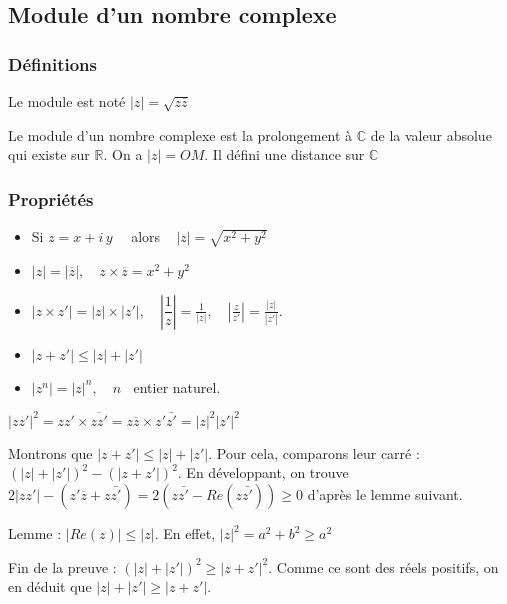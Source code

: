 \documentclass[french]{yLectureNote}
\newcommand{\bz}{\overline{z}}
\begin{document}
\subsection{Module d'un nombre complexe}
\subsubsection{Définitions}


Le module est noté $|z| = \sqrt{z\bz}$

Le module d'un nombre complexe est la prolongement à $\mathbb{C}$ de la valeur absolue qui existe sur $\mathbb{R}$. On a $|z| = OM$. Il défini une distance sur $\mathbb{C}$
\subsubsection{Propriétés}
\begin{itemize}
\item Si $z=x+i\,y\quad $ alors $\;\;\;|z|=\sqrt{x^2+y^2}\;$
\item $|z|=\left|\overline{z}\right|,\quad z\times\overline{z}=x^2+y^2$
\item $\left|z\times z'\right|=|z|\times|z'|,\quad \left|\dfrac{1}{z}\right|=\frac{1}{|z|},\quad \left|\frac{z}{z'}\right|=\frac{|z|}{|z'|} $.
\item $|z+z'|\leq |z|+|z'|$
\item $\left| z^n\right|=|z|^n,\quad n\;\;$ entier naturel.
\end{itemize}
\begin{myproof}
$|zz'|^2 = zz'\times \overline{zz'} = z\bz \times z'\bar{z'} = |z|^2|z'|^2$

Montrons que $|z+z'|\leq |z|+|z'|$. Pour cela, comparons leur carré : $(|z|+|z'|)^2-(|z+z'|)^2$. En développant, on trouve $2|zz'| - (z'\bz + z\bar{z'}) = 2(z\bar{z'} - Re(z\bar{z'})) \geq 0$ d'après le lemme suivant.

Lemme : $|Re(z)|\leq |z|$. En effet, $|z|^2 = a^2+b^2 \geq a^2$

Fin de la preuve : $(|z|+|z'|)^2 \geq |z+z'|^2$. Comme ce sont des réels positifs, on en déduit que $|z|+|z'| \geq |z+z'|$.
\end{myproof}

\end{document}
